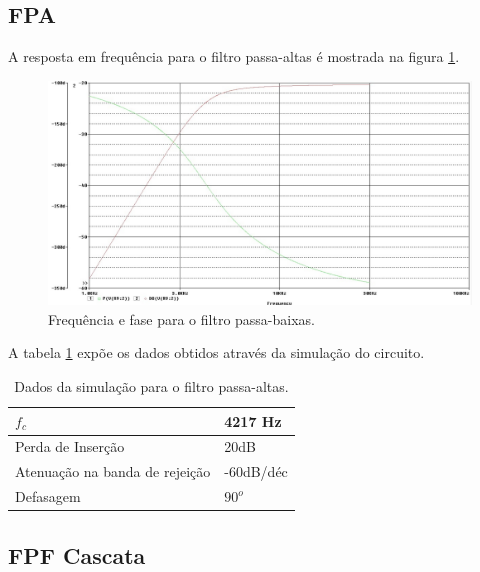 \subsection{FPA}

A resposta em frequência para o filtro passa-altas é mostrada na figura \ref{fRFPA}.

\begin{figure}[H]
 \centering
 \label{fRFPA}
 \includegraphics[scale=0.5]{Imagens/rfpa.jpg}
 \caption{Frequência e fase para o filtro passa-baixas.}
 \end{figure}
  
A tabela \ref{tFPA} expõe os dados obtidos através da simulação do circuito.

\begin{small}
\begin{table}[H]
\begin{center}
\caption{Dados da simulação para o filtro passa-altas.}

\begin{tabular}{l|l}
\hline
\hline
$f_c$ & 4217 Hz\\
\hline
Perda de Inserção & 20dB\\
\hline
Atenuação na banda de rejeição & -60dB/déc \\
\hline
Defasagem & $90^o$ \\
\hline
\hline
\end{tabular}

\label{tFPA}
\end{center}
\end{table}
\end{small}

\subsection{FPF Cascata}

